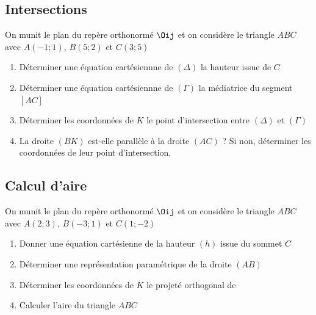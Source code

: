 \documentclass[oneside,12pt]{book}          %
\begin{document}
\subsection{Intersections}
On munit le plan du repère orthonormé $\Oij$ et on considère le triangle $ABC$ avec $A(-1;1)$, $B(5;2)$ et $C(3;5)$
\begin{enumerate}
    \item Déterminer une équation cartésiennne de $(\Delta)$ la hauteur issue de $C$
    \item Déterminer une équation cartésiennne de $(\Gamma)$ la médiatrice du segment $[AC]$
    \item Déterminer les coordonnées de $K$ le point d'intersection entre $(\Delta)$ et $(\Gamma)$
    \item La droite $(BK)$ est-elle parallèle à la droite $(AC)$ ? Si non, déterminer les coordonnées de leur point d'intersection.
\end{enumerate}



\subsection{Calcul d'aire}
On munit le plan du repère orthonormé $\Oij$ et on considère le triangle $ABC$ avec $A(2;3)$, $B(-3;1)$ et $C(1;-2)$
\begin{enumerate}
    \item Donner une équation cartésienne de la hauteur $(h)$ issue du sommet $C$
    \item Déterminer une représentation paramétrique de la droite $(AB)$
    \item Déterminer les coordonnées de $K$ le projeté orthogonal de 
    \item Calculer l'aire du triangle $ABC$
\end{enumerate}
\end{document}

